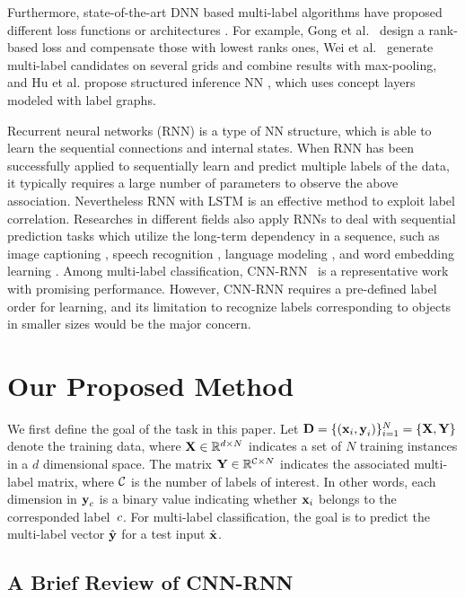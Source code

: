 \documentclass[letterpaper]{article} %
\begin{document}
Furthermore, state-of-the-art DNN based multi-label algorithms have proposed different loss functions or architectures \cite{gong2013deep,wei2014cnn,hu2016learning}. For example, Gong et al.~\cite{gong2013deep} design a rank-based loss and compensate those with lowest ranks ones, Wei et al.~\cite{wei2014cnn} generate multi-label candidates on several grids and combine results with max-pooling, and Hu et al. propose structured inference NN \cite{hu2016learning}, which uses concept layers modeled with label graphs.

Recurrent neural networks (RNN) is a type of NN structure, which is able to learn the sequential connections and internal states. When RNN has been successfully applied to sequentially learn and predict multiple labels of the data, it typically requires a large number of parameters to observe the above association. Nevertheless RNN with LSTM \cite{hochreiter1997long} is an effective method to exploit label correlation. Researches in different fields also apply RNNs to deal with sequential prediction tasks which utilize the long-term dependency in a sequence, such as image captioning \cite{mao2014deep}, speech recognition \cite{graves2013speech}, language modeling \cite{sundermeyer2012lstm}, and word embedding learning \cite{le2015compositional}. Among multi-label classification, CNN-RNN~\cite{wang2016cnn} is a representative work with promising performance. However, CNN-RNN requires a pre-defined label order for learning, and its limitation to recognize labels corresponding to objects in smaller sizes would be the major concern.


\section{Our Proposed Method}
We first define the goal of the task in this paper. Let $\textbf{D}=\{(\textbf{x}_i,\textbf{y}_i)\}_{i=1}^N = \{\textbf{X},\textbf{Y}\}$ denote the training data, where $\textbf{X} \in \mathbb{R}^{d\times N}$ indicates a set of $N$ training instances in a $d$ dimensional space. The matrix $\textbf{Y} \in \mathbb{R}^{\mathcal{C}\times N}$ indicates the associated multi-label matrix, where $\mathcal{C}$ is the number of labels of interest. In other words, each dimension in $\textbf{y}_c$ is a binary value indicating whether $\textbf{x}_i$ belongs to the corresponded label~$c$. For multi-label classification, the goal is to predict the multi-label vector $\hat{\textbf{y}}$ for a test input $\hat{\textbf{x}}$.

\subsection{A Brief Review of CNN-RNN}
\end{document}
